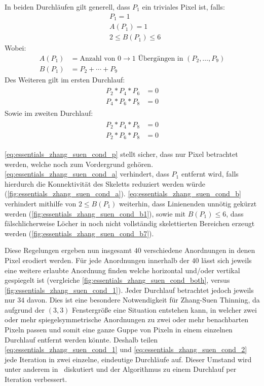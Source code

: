 In beiden Durchläufen gilt generell, dass \(P_1\) ein triviales Pixel ist, falls:
\begin{align}
    \label{eq:essentials_zhang_suen_cond_p} & P_1 = 1 \\
    \label{eq:essentials_zhang_suen_cond_a} & A(P_1) = 1 \\
    \label{eq:essentials_zhang_suen_cond_b} & 2 \leq B(P_1) \leq 6
\end{align}
Wobei:
\begin{align}
    A(P_1) &= \text{Anzahl von }0 \to 1\text{ Übergängen in }(P_2, \ldots, P_9) \\
    B(P_1) &= P_2 + \cdots + P_9
\end{align}
Des Weiteren gilt im ersten Durchlauf:
\begin{align}
    \label{eq:essentials_zhang_suen_cond_1}
    \begin{split}
        P_2 * P_4 * P_6 &= 0 \\
        P_4 * P_6 * P_8 &= 0
    \end{split}
\end{align}
Sowie im zweiten Durchlauf:
\begin{align}
    \label{eq:essentials_zhang_suen_cond_2}
    \begin{split}
        P_2 * P_4 * P_8 &= 0 \\
        P_2 * P_6 * P_8 &= 0
    \end{split}
\end{align}

\autoref{eq:essentials_zhang_suen_cond_p} stellt sicher, dass nur Pixel betrachtet werden, welche noch zum Vordergrund gehören.
\autoref{eq:essentials_zhang_suen_cond_a} verhindert, dass \(P_1\) entfernt wird, falls hierdurch die Konnektivität des Skeletts reduziert werden würde (\autoref{fig:essentials_zhang_suen_cond_a}).
\autoref{eq:essentials_zhang_suen_cond_b} verhindert mithilfe von \(2 \leq B(P_1)\)  weiterhin, dass Linienenden unnötig gekürzt werden (\autoref{fig:essentials_zhang_suen_cond_b1}), sowie mit \(B(P_1) \leq 6\), dass fälschlicherweise Löcher in noch nicht vollständig skelettierten Bereichen erzeugt werden (\autoref{fig:essentials_zhang_suen_cond_b7}).

Diese Regelungen ergeben nun insgesamt \(40\) verschiedene Anordnungen in denen Pixel erodiert werden.
Für jede Anordnungen innerhalb der \(40\) lässt sich jeweils eine weitere erlaubte Anordnung finden welche horizontal und/oder vertikal gespiegelt ist (vergleiche \autoref{fig:essentials_zhang_suen_cond_both}, versus \autoref{fig:essentials_zhang_suen_cond_1}).
Jeder Durchlauf betrachtet jedoch jeweils nur \(34\) davon.
Dies ist eine besondere Notwendigkeit für Zhang-Suen Thinning, da aufgrund der \((3,3)\) Fenstergröße eine Situation entstehen kann, in welcher zwei oder mehr spiegelsymmetrische Anordnungen zu zwei oder mehr benachbarten Pixeln passen und somit eine ganze Guppe von Pixeln in einem einzelnen Durchlauf entfernt werden könnte.
Deshalb teilen \autoref{eq:essentials_zhang_suen_cond_1} und \autoref{eq:essentials_zhang_suen_cond_2} jede Iteration in zwei einzelne, eindeutige Durchläufe auf.
Dieser Umstand wird unter anderem in~\cite{DBLP:conf/icpr/ZhangW88a} diskutiert und der Algorithmus zu einem Durchlauf per Iteration verbessert.

